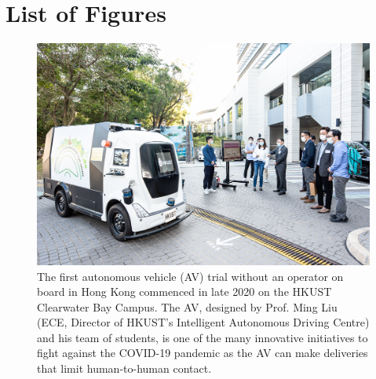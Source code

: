 \chapter{List of Figures}

\begin{figure}[!ht]
    \centering
    \includegraphics[width=0.9\columnwidth]{figure/pqe/hercules.jpg}
    \caption{The first autonomous vehicle (AV) trial without an operator on board in Hong Kong commenced in late 2020 on the HKUST Clearwater Bay Campus. The AV, designed by Prof. Ming Liu (ECE, Director of HKUST’s Intelligent Autonomous Driving Centre) and his team of students, is one of the many innovative initiatives to fight against the COVID-19 pandemic as the AV can make deliveries that limit human-to-human contact.}
    \label{fig:Hercules}
 \end{figure}

